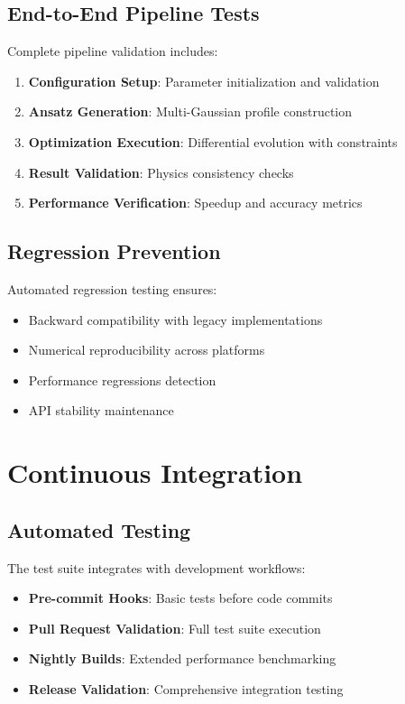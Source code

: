 \documentclass[12pt]{article}
\begin{document}
\subsection{End-to-End Pipeline Tests}

Complete pipeline validation includes:

\begin{enumerate}
\item \textbf{Configuration Setup}: Parameter initialization and validation
\item \textbf{Ansatz Generation}: Multi-Gaussian profile construction
\item \textbf{Optimization Execution}: Differential evolution with constraints
\item \textbf{Result Validation}: Physics consistency checks
\item \textbf{Performance Verification}: Speedup and accuracy metrics
\end{enumerate}

\subsection{Regression Prevention}

Automated regression testing ensures:
\begin{itemize}
\item Backward compatibility with legacy implementations
\item Numerical reproducibility across platforms
\item Performance regressions detection
\item API stability maintenance
\end{itemize}

\section{Continuous Integration}

\subsection{Automated Testing}

The test suite integrates with development workflows:
\begin{itemize}
\item \textbf{Pre-commit Hooks}: Basic tests before code commits
\item \textbf{Pull Request Validation}: Full test suite execution
\item \textbf{Nightly Builds}: Extended performance benchmarking
\item \textbf{Release Validation}: Comprehensive integration testing
\end{itemize}
\end{document}
